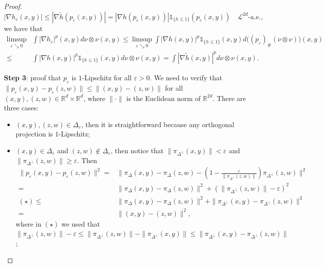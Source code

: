 \documentclass[10pt,a4paper]{amsart}
\newcommand{\R}{\mathbb{R}}
\begin{document}
\begin{proof}
    \[|\nabla h_\varepsilon(x,y)| \leq |\nabla \tilde{h}(p_\varepsilon(x,y))| = |\nabla h(p_\varepsilon(x,y))| \mathds{1}_{\{h\leq 1\}}(p_\varepsilon(x,y)) \quad \mathcal{L}^{2d}\text{-a.e.},\] 
    we have that 
    \begin{align*}
        \limsup_{\varepsilon\searrow 0} &  \int |\nabla h_\varepsilon|^p(x,y) d\nu\otimes \nu(x,y) \leq \limsup_{\varepsilon\searrow 0} \int |\nabla h(x,y)|^p\mathds{1}_{ \{h\leq 1\} } (x,y ) d\big((p_\varepsilon)_\#(\nu \otimes \nu)\big)(x,y) 
        \\
        \leq & 
        \int |\nabla h(x,y)|^p\mathds{1}_{\{h\leq 1\}}(x,y) d\nu\otimes \nu(x,y) = \int |\nabla \tilde{h}(x,y)|^p d\nu\otimes \nu(x,y).
    \end{align*}

    \textbf{Step 3}: proof that $p_\varepsilon$ is $1$-Lipschitz for all $\varepsilon>0$. We need to verify that $\|p_\varepsilon(x,y) - p_\varepsilon(z,w)\| \leq \|(x,y) - (z,w)\|$ for all $(x,y),(z,w)\in \R^d\times \R^d$, where $\|\cdot\|$ is the Euclidean norm of $\R^{2d}$. There are three cases:
    \begin{itemize}
        \item $(x,y),(z,w) \in \Delta_\varepsilon$, then it is straightforward because any orthogonal projection is $1$-Lipschitz;
        \item $(x,y)\in \Delta_\varepsilon$ and $(z,w)\notin \Delta_\varepsilon$, then notice that $\|\pi_{\Delta^\perp}(x,y)\|<\varepsilon$ and $\|\pi_{\Delta^\perp}(z,w)\|\geq \varepsilon$. Then
        \begin{align*}
            \|p_\varepsilon(x,y) - p_\varepsilon(z,w)\|^2 
             = &
            \| \pi_\Delta(x,y) - \pi_\Delta(z,w) -\left(1- \frac{\varepsilon}{\|\pi_{\Delta^\perp}(z,w)\|} \right)\pi_{\Delta^\perp}(z,w) \|^2
            \\
             = &
            \|\pi_\Delta(x,y) - \pi_\Delta(z,w)\|^2 + \left(\|\pi_{\Delta^\perp}(z,w)\| - \varepsilon\right)^2
            \\
            (\star) \leq &
            \|\pi_\Delta(x,y) - \pi_\Delta(z,w)\|^2 + \|\pi_{\Delta^\perp}(x,y) - \pi_{\Delta^\perp}(z,w)\|^2 
            \\
            = & \|(x,y) - (z,w)\|^2,
        \end{align*}
        where in $(\star)$ we used that $\|\pi_{\Delta^\perp}(z,w)\| - \varepsilon\leq \|\pi_{\Delta^\perp}(z,w)\| - \|\pi_{\Delta^\perp}(x,y)\|\leq \|\pi_{\Delta^\perp}(x,y) - \pi_{\Delta^\perp}(z,w)\|$;

\end{itemize}
\end{proof}
\end{document}
